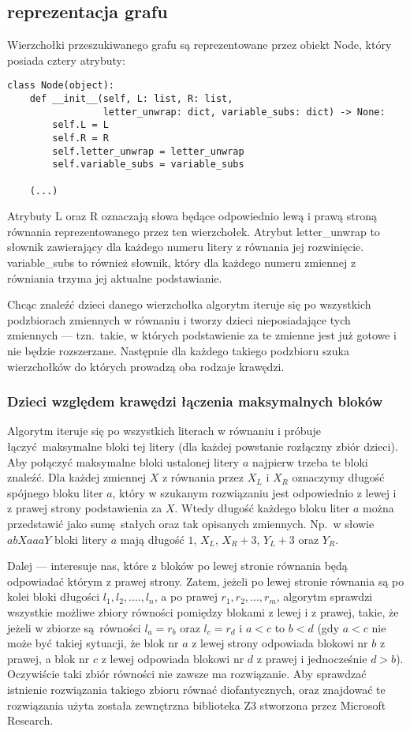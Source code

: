 \documentclass[leqno, 12pt]{article}
\begin{document}
\subsection{reprezentacja grafu}
Wierzchołki przeszukiwanego grafu są reprezentowane przez obiekt Node, który posiada cztery atrybuty:
\begin{verbatim}
class Node(object):
    def __init__(self, L: list, R: list, 
                 letter_unwrap: dict, variable_subs: dict) -> None:
        self.L = L
        self.R = R
        self.letter_unwrap = letter_unwrap
        self.variable_subs = variable_subs

    (...)
\end{verbatim}
Atrybuty L oraz R oznaczają słowa będące odpowiednio lewą i prawą stroną równania reprezentowanego przez ten wierzchołek. Atrybut letter\_unwrap to słownik zawierający dla każdego numeru litery z równania jej rozwinięcie. variable\_subs to również słownik, który dla każdego numeru zmiennej z równiania trzyma jej aktualne podstawianie.


Chcąc znaleźć dzieci danego wierzchołka algorytm iteruje się po wszystkich podzbiorach zmiennych w równaniu i tworzy dzieci nieposiadające tych zmiennych --- tzn.\ takie, w których podstawienie za te zmienne jest już gotowe i nie będzie rozszerzane. Następnie dla każdego takiego podzbioru szuka wierzchołków do których prowadzą oba rodzaje krawędzi.

\subsubsection*{Dzieci względem krawędzi łączenia maksymalnych bloków}
Algorytm iteruje się po wszystkich literach w równaniu i próbuje łączyć maksymalne bloki tej litery (dla każdej powstanie rozłączny zbiór dzieci).
Aby połączyć maksymalne bloki ustalonej litery $a$ najpierw trzeba te bloki znaleźć. Dla każdej zmiennej $X$ z równania przez $X_L$ i $X_R$ oznaczymy długość spójnego bloku liter $a$, który w szukanym rozwiązaniu jest odpowiednio z lewej i z prawej strony podstawienia za $X$. Wtedy długość każdego bloku liter $a$ można przedstawić jako sumę stałych oraz tak opisanych zmiennych. Np.\ w słowie $abXaaaY$ bloki litery $a$ mają długość $1$, $X_L$, $X_R + 3$, $Y_L + 3$ oraz $Y_R$.

Dalej --- interesuje nas, które z bloków po lewej stronie równania będą odpowiadać którym z prawej strony. Zatem, jeżeli po lewej stronie równania są po kolei bloki długości $l_1, l_2, ...., l_n$, a po prawej $r_1, r_2, ..., r_m$, algorytm sprawdzi wszystkie możliwe zbiory równości pomiędzy blokami z lewej i z prawej, takie, że jeżeli w zbiorze są równości $l_a = r_b$ oraz $l_c = r_d$ i $a < c$ to $b < d$ (gdy $a < c$ nie może być takiej sytuacji, że blok nr $a$ z lewej strony odpowiada blokowi nr $b$ z prawej, a blok nr $c$ z lewej odpowiada blokowi nr $d$ z prawej i jednocześnie $d > b$). Oczywiście taki zbiór równości nie zawsze ma rozwiązanie. Aby sprawdzać istnienie rozwiązania takiego zbioru równać diofantycznych, oraz znajdować te rozwiązania użyta została zewnętrzna biblioteka Z3 stworzona przez Microsoft Research.
\end{document}
